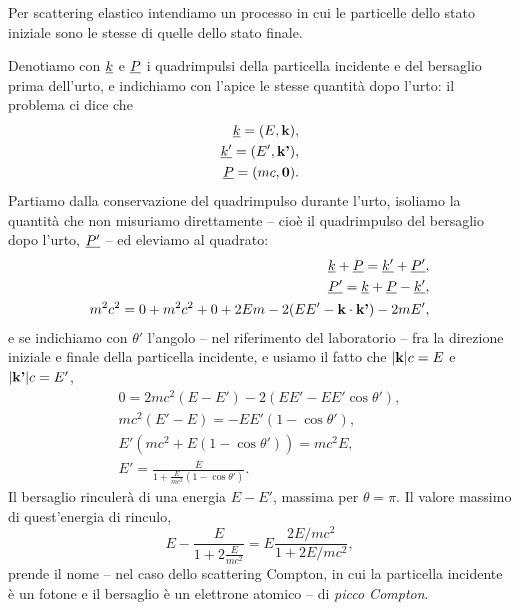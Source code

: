 \begin{Answer}
Per scattering elastico intendiamo un processo in cui le particelle dello stato iniziale sono le stesse di quelle dello stato finale.

Denotiamo con $\underline{k}$ e $\underline{P}$ i quadrimpulsi della particella incidente e del bersaglio prima dell'urto, e indichiamo con l'apice le stesse quantità dopo l'urto: il problema ci dice che
\begin{align*}
    \underline{k} = (E, \textbf{k}),\\
    \underline{k'} = (E', \textbf{k'}),\\
    \underline{P} = (mc, \textbf{0}).\\
\end{align*}
Partiamo dalla conservazione del quadrimpulso durante l'urto, isoliamo la quantità che non misuriamo direttamente -- cioè il quadrimpulso del bersaglio dopo l'urto, $\underline{P'}$ -- ed eleviamo al quadrato:
\begin{align*}
    \underline{k} + \underline{P} = \underline{k'} + \underline{P'},\\
    \underline{P'} = \underline{k} + \underline{P} - \underline{k'},\\
    m^2c^2 = 0 + m^2c^2 + 0 + 2Em-2(EE'-\textbf{k}\cdot\textbf{k'})-2mE',
\end{align*}
e se indichiamo con $\theta'$ l'angolo -- nel riferimento del laboratorio -- fra la direzione iniziale e finale della particella incidente, e usiamo il fatto che $|\textbf{k}|c = E$ e $|\textbf{k'}|c = E'$,
\begin{align*}
    0= 2mc^2(E-E')-2(EE'-EE'\cos\theta'),\\
    mc^2(E'-E) = -EE'(1-\cos\theta'),\\
    E'(mc^2 + E(1-\cos\theta')) = mc^2E,\\
    E' = \frac{E}{1 + \frac{E}{mc^2}(1-\cos\theta')}.
\end{align*}
Il bersaglio rinculerà di una energia $E-E'$, massima per $\theta=\pi$. Il valore massimo di quest'energia di rinculo,
\begin{equation*}
    E-\frac{E}{1+2\frac{E}{mc^2}} = E\frac{2E/mc^2}{1+2E/mc^2},
\end{equation*}
prende il nome -- nel caso dello scattering Compton, in cui la particella incidente è un fotone e il bersaglio è un elettrone atomico -- di \emph{picco Compton}.


\end{Answer}
